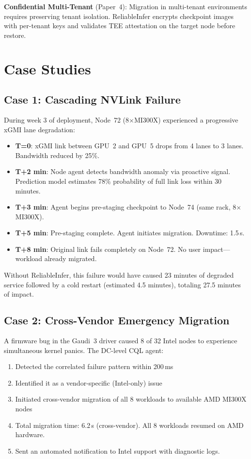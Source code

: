 \documentclass[conference,10pt,letterpaper]{IEEEtran}
\begin{document}
\textbf{Confidential Multi-Tenant} (Paper~4): Migration in multi-tenant environments requires preserving tenant isolation. ReliableInfer encrypts checkpoint images with per-tenant keys and validates TEE attestation on the target node before restore.



\section{Case Studies}
\label{sec:cases}

\subsection{Case 1: Cascading NVLink Failure}

During week 3 of deployment, Node~72 (8$\times$MI300X) experienced a progressive xGMI lane degradation:
\begin{itemize}
\item \textbf{T=0}: xGMI link between GPU~2 and GPU~5 drops from 4 lanes to 3 lanes. Bandwidth reduced by 25\%.
\item \textbf{T+2 min}: Node agent detects bandwidth anomaly via proactive signal. Prediction model estimates 78\% probability of full link loss within 30 minutes.
\item \textbf{T+3 min}: Agent begins pre-staging checkpoint to Node~74 (same rack, 8$\times$MI300X).
\item \textbf{T+5 min}: Pre-staging complete. Agent initiates migration. Downtime: 1.5\,s.
\item \textbf{T+8 min}: Original link fails completely on Node~72. No user impact---workload already migrated.
\end{itemize}

Without ReliableInfer, this failure would have caused 23 minutes of degraded service followed by a cold restart (estimated 4.5 minutes), totaling 27.5 minutes of impact.

\subsection{Case 2: Cross-Vendor Emergency Migration}

A firmware bug in the Gaudi~3 driver caused 8 of 32 Intel nodes to experience simultaneous kernel panics. The DC-level CQL agent:
\begin{enumerate}
\item Detected the correlated failure pattern within 200\,ms
\item Identified it as a vendor-specific (Intel-only) issue
\item Initiated cross-vendor migration of all 8 workloads to available AMD MI300X nodes
\item Total migration time: 6.2\,s (cross-vendor). All 8 workloads resumed on AMD hardware.
\item Sent an automated notification to Intel support with diagnostic logs.
\end{enumerate}
\end{document}
